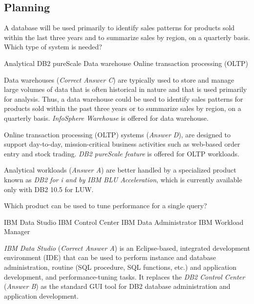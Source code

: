 \documentclass[answers, 11pt]{exam}
\begin{document}
\begin{questions}

\section{Planning}
\addpoints
\question[1]
A database will be used primarily to identify sales patterns
for products sold within the last three years and to summarize
sales by region, on a quarterly basis. Which type of system is 
needed?
\begin{choices}
\choice Analytical
\choice DB2 pureScale
\CorrectChoice Data warehouse
\choice Online transaction processing (OLTP)
\end{choices}

\begin{solution}
Data warehouses (\textit{Correct Answer C}) are typically used to store and manage large volumes of data that is often
historical in nature and that is used primarily for analysis. Thus, a data warehouse could be used to identify sales patterns
for products sold within the past three years or to summarize sales by region, on a quarterly basis. \textit{InfoSphere Warehouse} is offered for data warehouse.
\par

Online transaction processing (OLTP) systems (\textit{Answer D}), are designed to support day-to-day, mission-critical business
activities such as web-based order entry and stock trading. \textit{DB2 pureScale feature} is offered for OLTP workloads. 
\par

{\color{red} Analytical} workloads (\textit{Answer A}) are better handled by a specialized product
known as \textit{DB2 for i and by IBM BLU Acceleration}, which is currently available
only with DB2 10.5 for LUW.

\end{solution}

\question[1]
Which product can be used to tune performance for a single query?
\begin{choices}
\CorrectChoice IBM Data Studio
\choice IBM Control Center
\choice IBM Data Administrator
\choice IBM Workload Manager
\end{choices}

\begin{solution}
\textit{IBM Data Studio} (\textit{Correct Answer A}) is an Eclipse-based, integrated
development environment (IDE) that can be used to perform instance and database
administration, routine (SQL procedure, SQL functions, etc.) and application
development, and performance-tuning tasks. It replaces the \textit{DB2 Control Center} 
(\textit{Answer B}) as the standard GUI tool for DB2 database administration and
application development.
\par


\end{solution}
\end{questions}
\end{document}
